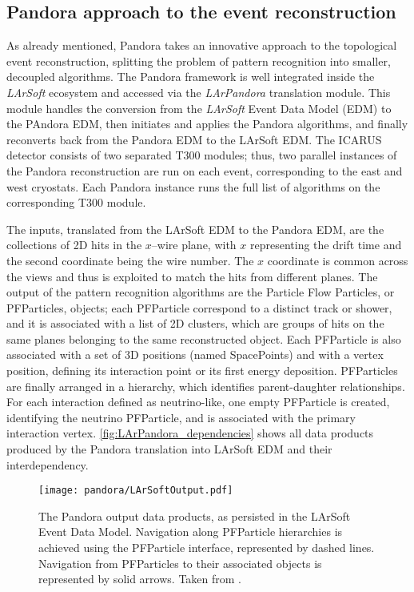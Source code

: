 \subsection{Pandora approach to the event reconstruction} 

As already mentioned, Pandora takes an innovative approach to the topological event reconstruction, splitting the problem of pattern recognition into smaller, decoupled algorithms. The Pandora framework is well integrated inside the \emph{LArSoft} ecosystem and accessed via the \emph{LArPandora} translation module. This module handles the conversion from the \emph{LArSoft} Event Data Model (EDM) to the PAndora EDM, then initiates and applies the Pandora algorithms, and finally reconverts back from the Pandora EDM to the LArSoft EDM. The ICARUS detector consists of two separated T300 modules; thus, two parallel instances of the Pandora reconstruction are run on each event, corresponding to the east and west cryostats. Each Pandora instance runs the full list of algorithms on the corresponding T300 module. 

The inputs, translated from the LArSoft EDM to the Pandora EDM, are the collections of 2D hits in the $x$--wire plane, with $x$ representing the drift time and the second coordinate being the wire number. The $x$ coordinate is common across the views and thus is exploited to match the hits from different planes. The output of the pattern recognition algorithms are the Particle Flow Particles, or PFParticles, objects; each PFParticle correspond to a distinct track or shower, and it is associated with a list of 2D clusters, which are groups of hits on the same planes belonging to the same reconstructed object. Each PFParticle is also associated with a set of 3D positions (named SpacePoints) and with a vertex position, defining its interaction point or its first energy deposition. PFParticles are finally arranged in a hierarchy, which identifies parent-daughter relationships. For each interaction defined as neutrino-like, one empty PFParticle is created, identifying the neutrino PFParticle, and is associated with the primary interaction vertex. \autoref{fig:LArPandora_dependencies} shows all data products produced by the Pandora translation into LArSoft EDM and their interdependency. 

\begin{figure}
    \centering
    \texttt{[image: pandora/LArSoftOutput.pdf]}
    \caption[LArPandora output data products]{The Pandora output data products, as persisted in the LArSoft Event Data Model. Navigation along PFParticle hierarchies is achieved using the PFParticle interface, represented by dashed lines. Navigation from PFParticles to their associated objects is represented by solid arrows. Taken from \cite{MicroBooNE:2017xvs}. }
    \label{fig:LArPandora_dependencies}
\end{figure}

